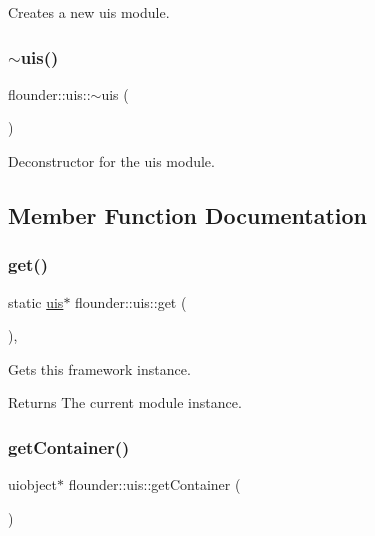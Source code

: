 Creates a new uis module. 

\mbox{\label{classflounder_1_1uis_ab258b390cfadde407fc72d1adbb14f17}} 
\subsubsection{\texorpdfstring{$\sim$uis()}{~uis()}}
{\footnotesize\ttfamily flounder\+::uis\+::$\sim$uis (\begin{DoxyParamCaption}{ }\end{DoxyParamCaption})}



Deconstructor for the uis module. 



\subsection{Member Function Documentation}
\mbox{\label{classflounder_1_1uis_aac58b792bb86c0b2d1c5a67de0ec0c22}} 
\subsubsection{\texorpdfstring{get()}{get()}}
{\footnotesize\ttfamily static \hyperlink{classflounder_1_1uis}{uis}$\ast$ flounder\+::uis\+::get (\begin{DoxyParamCaption}{ }\end{DoxyParamCaption})\hspace{0.3cm}{\ttfamily [inline]}, {\ttfamily [static]}}



Gets this framework instance. 

\begin{DoxyReturn}{Returns}
The current module instance. 
\end{DoxyReturn}
\mbox{\label{classflounder_1_1uis_aa33276aec565ade80ad7770b0e3b9e67}} 
\subsubsection{\texorpdfstring{get\+Container()}{getContainer()}}
{\footnotesize\ttfamily uiobject$\ast$ flounder\+::uis\+::get\+Container (\begin{DoxyParamCaption}{ }\end{DoxyParamCaption})\hspace{0.3cm}{\ttfamily [inline]}}



